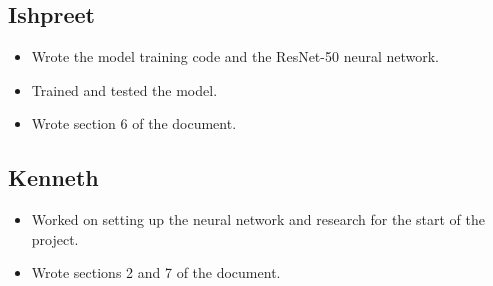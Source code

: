 \documentclass[11pt]{article}
\begin{document}
\subsection{Ishpreet}

\begin{itemize}
  \item Wrote the model training code and the ResNet-50 neural network.
  \item Trained and tested the model.
  \item Wrote section 6 of the document.
\end{itemize}

\subsection{Kenneth}

\begin{itemize}
  \item Worked on setting up the neural network and research for the start of the project.
  \item Wrote sections 2 and 7 of the document.
\end{itemize}

%





\end{document}
